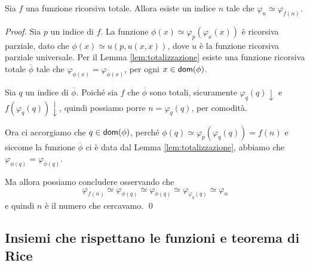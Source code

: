 \documentclass[runningheads,a4paper]{llncs}
\begin{document}
\begin{theorem}\label{thm:fixpoint}
Sia $f$ una funzione ricorsiva totale. Allora esiste un indice $n$ tale che $\varphi_{n} \simeq \varphi_{f(n)}$.
\end{theorem}

\begin{proof}
Sia $p$ un indice di $f$. La funzione $\phi(x) \simeq \varphi_p(\varphi_x(x))$ \`{e} ricorsiva parziale, dato che 
 $\phi(x) \simeq u(p,u(x,x))$, dove $u$ \`{e} la funzione ricorsiva parziale universale.
 Per il Lemma \ref{lem:totalizzazione} esiste una funzione ricorsiva totale $\overline{\phi}$ tale che
 $\varphi_{\phi(x)} = \varphi_{\overline{\phi}(x)}$, per ogni $x \in \mathsf{dom}(\phi)$.

Sia $q$ un indice di $\overline{\phi}$. Poich\'{e} sia $f$ che $\overline{\phi}$ sono totali,
 sicuramente $\varphi_q(q)\downarrow$ e $f(\varphi_q(q))\downarrow$, quindi possiamo porre $n=\varphi_q(q)$, per comodit\`{a}.

Ora ci accorgiamo che $q \in \mathsf{dom}(\phi)$, perch\'{e} $\phi(q)\simeq\varphi_p(\varphi_q(q)) = f(n)$ e siccome la funzione
 $\overline{\phi}$ ci \`{e} data dal Lemma \ref{lem:totalizzazione}, abbiamo che $\varphi_{\phi(q)} = \varphi_{\overline{\phi}(q)}$.

Ma allora possiamo concludere osservando che
$$ \varphi_{f(n)} \simeq \varphi_{\phi(q)} \simeq \varphi_{\overline{\phi}(q)} \simeq \varphi_{\varphi_q(q)} \simeq \varphi_n $$
e quindi $n$ \`{e} il numero che cercavamo.
\qed\end{proof}

% 
% 

\subsection{Insiemi che rispettano le funzioni e teorema di Rice}
\end{document}
